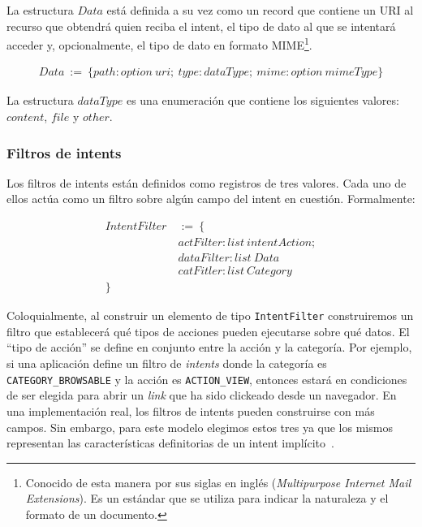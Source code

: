 La estructura $Data$ está definida a su vez como un record que contiene un URI al recurso que
obtendrá quien reciba el intent, el tipo de dato al que se intentará acceder y, opcionalmente, el
tipo de dato en formato MIME\footnote{

    Conocido de esta manera por sus siglas en inglés (\textit{Multipurpose Internet Mail
        Extensions}). Es un estándar que se utiliza para indicar la naturaleza y el formato de un
    documento.

}.

\begin{align*}
    Data\ :=\ \{ path: option\ uri;\ type: dataType;\ mime: option\ mimeType \}
\end{align*}

La estructura $dataType$ es una enumeración que contiene los siguientes valores: $content$, $file$ y
$other$.

\subsubsection*{Filtros de intents}
Los filtros de intents están definidos como registros de tres valores. Cada uno de ellos actúa como
un filtro sobre algún campo del intent en cuestión. Formalmente:

\begin{align*}
    IntentFilter\  & :=\ \{                         \\
                   & actFilter: list\ intentAction; \\
                   & dataFilter: list\ Data         \\
                   & catFitler: list\ Category      \\
    \}
\end{align*}

Coloquialmente, al construir un elemento de tipo \texttt{IntentFilter} construiremos un filtro que
establecerá qué tipos de acciones pueden ejecutarse sobre qué datos. El ``tipo de acción'' se define
en conjunto entre la acción y la categoría. Por ejemplo, si una aplicación define un filtro de
\textit{intents} donde la categoría es \texttt{CATEGORY\_BROWSABLE} y la acción es
\texttt{ACTION\_VIEW}, entonces estará en condiciones de ser elegida para abrir un \textit{link} que
ha sido clickeado desde un navegador. En una implementación real, los filtros de intents pueden
construirse con más campos. Sin embargo, para este modelo elegimos estos tres ya que los mismos
representan las características definitorias de un intent implícito~\cite{android-intents}.

